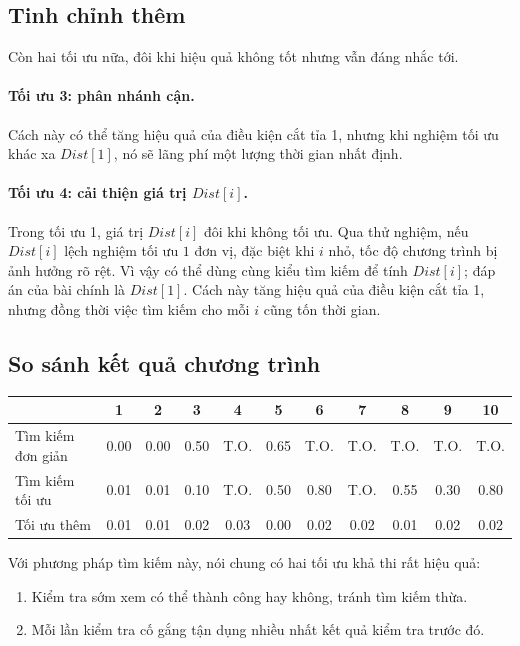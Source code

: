 \documentclass[11pt]{article}
\begin{document}
\subsection{Tinh chỉnh thêm}

Còn hai tối ưu nữa, đôi khi hiệu quả không tốt nhưng vẫn đáng nhắc tới.

\paragraph{Tối ưu 3: phân nhánh cận.}
Cách này có thể tăng hiệu quả của điều kiện cắt tỉa 1, nhưng khi nghiệm tối ưu
khác xa $\mathit{Dist}[1]$, nó sẽ lãng phí một lượng thời gian nhất định.

\paragraph{Tối ưu 4: cải thiện giá trị \(\mathit{Dist}[i]\).}
Trong tối ưu 1, giá trị $\mathit{Dist}[i]$ đôi khi không tối ưu. Qua thử
nghiệm, nếu $\mathit{Dist}[i]$ lệch nghiệm tối ưu $1$ đơn vị, đặc biệt khi
$i$ nhỏ, tốc độ chương trình bị ảnh hưởng rõ rệt. Vì vậy có thể dùng cùng
kiểu tìm kiếm để tính $\mathit{Dist}[i]$; đáp án của bài chính là
$\mathit{Dist}[1]$. Cách này tăng hiệu quả của điều kiện cắt tỉa 1, nhưng đồng
thời việc tìm kiếm cho mỗi $i$ cũng tốn thời gian.

\subsection{So sánh kết quả chương trình}

\begin{center}
\begin{tabular}{l|cccccccccc}
 & 1 & 2 & 3 & 4 & 5 & 6 & 7 & 8 & 9 & 10\\
\hline
Tìm kiếm đơn giản
 & 0.00 & 0.00 & 0.50 & T.O. & 0.65 & T.O. & T.O. & T.O. & T.O. & T.O.\\
Tìm kiếm tối ưu
 & 0.01 & 0.01 & 0.10 & T.O. & 0.50 & 0.80 & T.O. & 0.55 & 0.30 & 0.80\\
Tối ưu thêm
 & 0.01 & 0.01 & 0.02 & 0.03 & 0.00 & 0.02 & 0.02 & 0.01 & 0.02 & 0.02\\
\end{tabular}
\end{center}

Với phương pháp tìm kiếm này, nói chung có hai tối ưu khả thi rất hiệu quả:
\begin{enumerate}
  \item Kiểm tra sớm xem có thể thành công hay không, tránh tìm kiếm thừa.
  \item Mỗi lần kiểm tra cố gắng tận dụng nhiều nhất kết quả kiểm tra trước đó.
\end{enumerate}
\end{document}
